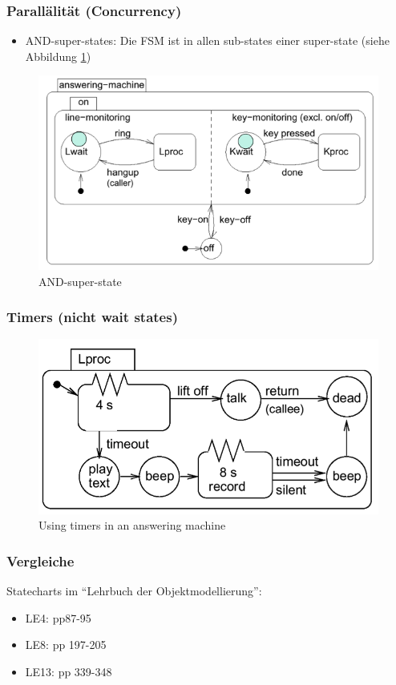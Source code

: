 \subsubsection{Parallälität (Concurrency)}
\begin{itemize}
  \item AND-super-states: Die FSM ist in allen sub-states einer super-state (siehe Abbildung \ref{fig:AND_super_state})
\end{itemize}
\begin{figure}[h]
  \centering
  {\includegraphics[scale = 0.4]{images/FSM/AND_super_state}  
  \caption{AND-super-state}
  \label{fig:AND_super_state}}
\end{figure} 

\subsubsection{Timers (nicht wait states)}
\begin{figure}[h]
  \centering
  {\includegraphics[scale = 0.2]{images/FSM/timer}  
  \caption{Using timers in an  answering machine}
  \label{fig:timer}}
\end{figure} 

\subsubsection{Vergleiche }
Statecharts im "`Lehrbuch der Objektmodellierung"':
\begin{itemize}
  \item LE4: pp87-95
  \item LE8: pp 197-205
  \item LE13: pp 339-348
\end{itemize}
\newpage
